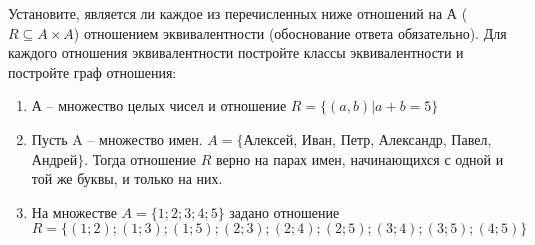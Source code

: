 \question
Установите, является ли каждое из перечисленных ниже отношений на А ($R \subseteq A \times A$) отношением эквивалентности (обоснование ответа обязательно). Для каждого отношения эквивалентности постройте классы 
эквивалентности и постройте граф отношения:
\begin{enumerate}
	\renewcommand{\labelenumi}{\alph{enumi})}
	\item А -- множество целых чисел и отношение $R = \{(a,b)|a + b = 5\}$
	\item Пусть A – множество имен. $A = \{ $Алексей, Иван, Петр, Александр, Павел, Андрей$ \}$. Тогда отношение $R $ верно на парах имен, начинающихся с одной и той же буквы, и только на них.
	\item На множестве $A = \{1; 2; 3; 4; 5\}$ задано отношение $R = \{(1; 2); (1; 3); (1; 5); (2; 3); (2; 4); (2; 5); (3; 4); (3; 5); (4; 5)\}$
\end{enumerate}